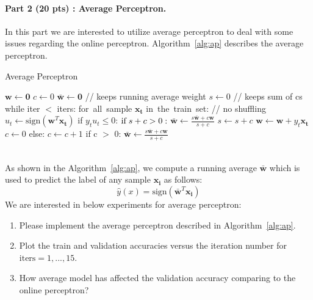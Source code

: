 \documentclass{article}
\begin{document}
{\paragraph{Part 2 (20 pts) : Average Perceptron.} In this part we are interested to utilize average perceptron to deal with some issues regarding the online perceptron. Algorithm~\ref{alg:ap} describes the average perceptron.\\
\begin{algorithm}
\caption{Average Perceptron}\label{alg:ap}
\begin{algorithmic}[1]
\State $\bm{w} \gets \bm{0}$
\State $c \gets 0$
\State $\bar{\bm{w}} \gets \bm{0}$ // keeps running average weight
\State $s \gets 0$ // keeps sum of cs
\State while iter $<$ iters:
\State \hspace{10mm} \mbox{for all sample} $\bm{x_t}$ \mbox{in the train set}: // no shuffling
\State \hspace{15mm} $u_t \gets \mbox{sign}(\bm{w}^{T} \bm{x_t})$
\State \hspace{15mm} if $y_t u_t \leq 0$:
\State \hspace{20mm} $\mbox{if} \hspace{1mm} s + c > 0:$	
\State \hspace{25mm} $\bar{\bm{w}} \gets \frac{s \bar{\bm{w}} + c\bm{w}}{s + c}$
\State \hspace{20mm} $s \gets s + c$		
\State \hspace{20mm} $\bm{w} \gets \bm{w} + y_t \bm{x_t}$
\State \hspace{20mm} $c \gets 0$
\State \hspace{15mm} else: $c \gets c + 1$
\State if c $>$ 0:
\State \hspace{10mm} $\bar{\bm{w}} \gets \frac{s \bar{\bm{w}} + c\bm{w}}{s + c}$
\EndProcedure
\end{algorithmic}
\end{algorithm}\\
As shown in the Algorithm~\ref{alg:ap}, we compute a running average $\bar{\bm{w}}$ which is used to predict the label of any sample $\bm{x_i}$ as follows:\\
\begin{equation}
    \hat{y}(x) = \mbox{sign}(\bm{\bar{w}}^{T}\bm{x_i})
\end{equation}
We are interested in below experiments for average perceptron:
\begin{enumerate}
\item Please implement the average perceptron described in Algorithm~\ref{alg:ap}.
\item Plot the train and validation accuracies versus the iteration number for  $\mbox{iters}=1, ...,15$.
\item How average model has affected the validation accuracy comparing to the online perceptron?
\end{enumerate}
}
\end{document}
